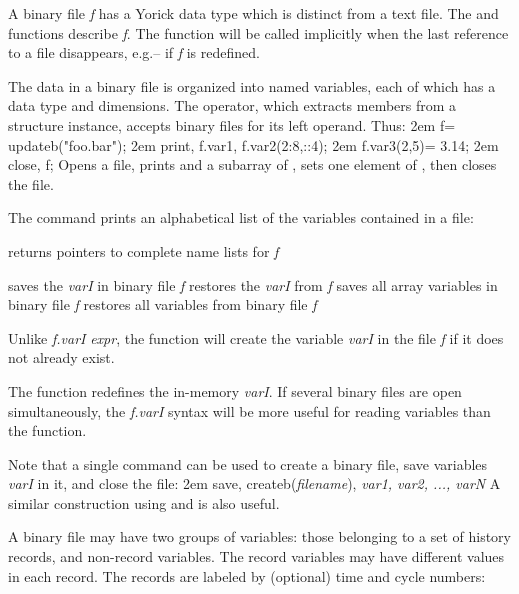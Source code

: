A binary file {\it f\/} has a Yorick data type which is distinct from a text
file.  The  and  functions describe {\it f\/}.  The
 function will be called implicitly when the last reference to
a file disappears, e.g.-- if {\it f} is redefined.

The data in a binary file is organized into named variables, each of
which has a data type and dimensions.  The  operator, which extracts
members from a structure instance, accepts binary files for its left
operand.  Thus:
\beginexample
\hglue2em f= updateb("foo.bar");
\hglue2em print, f.var1, f.var2(2:8,::4);
\hglue2em f.var3(2,5)= 3.14;
\hglue2em close, f;
\endexample
Opens a file, prints  and a subarray of , sets one
element of , then closes the file.

The  command prints an alphabetical list of the variables
contained in a file:

     {returns pointers to complete name lists for {\it f}}


     {saves the {\it varI\/} in binary file {\it f}}
     {restores the {\it varI\/} from {\it f}}
     {saves all array variables in binary file {\it f}}
     {restores all variables from binary file {\it f}}

Unlike {\it f.varI\/}\kbd{=} {\it expr}, the  function will
create the variable {\it varI\/} in the file {\it f\/} if it does not
already exist.

The  function redefines the in-memory
{\it varI\/}.  If several binary
files are open simultaneously, the {\it f.varI\/} syntax will be more
useful for reading variables than the  function.

Note that a single command can be used to create a binary file, save
variables {\it varI\/} in it, and close the file:
\beginexample
\hglue2em save, createb({\it filename\/}), {\it var1, var2, ..., varN}
\endexample
A similar construction using  and  is also useful.


A binary file may have two groups of variables: those belonging to a set
of history records, and non-record variables.
The record variables may have different values in each record.  The records
are labeled by (optional) time and cycle numbers:

